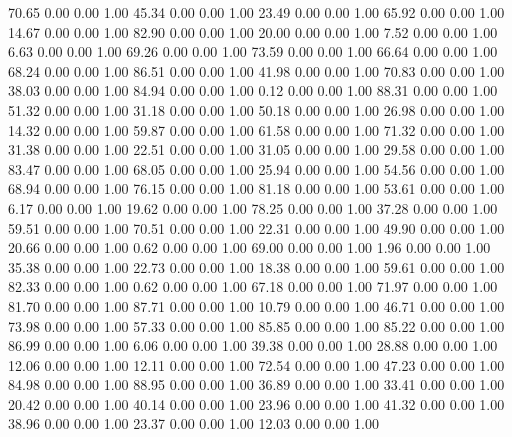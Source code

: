    70.65   0.00   0.00   1.00
   45.34   0.00   0.00   1.00
   23.49   0.00   0.00   1.00
   65.92   0.00   0.00   1.00
   14.67   0.00   0.00   1.00
   82.90   0.00   0.00   1.00
   20.00   0.00   0.00   1.00
    7.52   0.00   0.00   1.00
    6.63   0.00   0.00   1.00
   69.26   0.00   0.00   1.00
   73.59   0.00   0.00   1.00
   66.64   0.00   0.00   1.00
   68.24   0.00   0.00   1.00
   86.51   0.00   0.00   1.00
   41.98   0.00   0.00   1.00
   70.83   0.00   0.00   1.00
   38.03   0.00   0.00   1.00
   84.94   0.00   0.00   1.00
    0.12   0.00   0.00   1.00
   88.31   0.00   0.00   1.00
   51.32   0.00   0.00   1.00
   31.18   0.00   0.00   1.00
   50.18   0.00   0.00   1.00
   26.98   0.00   0.00   1.00
   14.32   0.00   0.00   1.00
   59.87   0.00   0.00   1.00
   61.58   0.00   0.00   1.00
   71.32   0.00   0.00   1.00
   31.38   0.00   0.00   1.00
   22.51   0.00   0.00   1.00
   31.05   0.00   0.00   1.00
   29.58   0.00   0.00   1.00
   83.47   0.00   0.00   1.00
   68.05   0.00   0.00   1.00
   25.94   0.00   0.00   1.00
   54.56   0.00   0.00   1.00
   68.94   0.00   0.00   1.00
   76.15   0.00   0.00   1.00
   81.18   0.00   0.00   1.00
   53.61   0.00   0.00   1.00
    6.17   0.00   0.00   1.00
   19.62   0.00   0.00   1.00
   78.25   0.00   0.00   1.00
   37.28   0.00   0.00   1.00
   59.51   0.00   0.00   1.00
   70.51   0.00   0.00   1.00
   22.31   0.00   0.00   1.00
   49.90   0.00   0.00   1.00
   20.66   0.00   0.00   1.00
    0.62   0.00   0.00   1.00
   69.00   0.00   0.00   1.00
    1.96   0.00   0.00   1.00
   35.38   0.00   0.00   1.00
   22.73   0.00   0.00   1.00
   18.38   0.00   0.00   1.00
   59.61   0.00   0.00   1.00
   82.33   0.00   0.00   1.00
    0.62   0.00   0.00   1.00
   67.18   0.00   0.00   1.00
   71.97   0.00   0.00   1.00
   81.70   0.00   0.00   1.00
   87.71   0.00   0.00   1.00
   10.79   0.00   0.00   1.00
   46.71   0.00   0.00   1.00
   73.98   0.00   0.00   1.00
   57.33   0.00   0.00   1.00
   85.85   0.00   0.00   1.00
   85.22   0.00   0.00   1.00
   86.99   0.00   0.00   1.00
    6.06   0.00   0.00   1.00
   39.38   0.00   0.00   1.00
   28.88   0.00   0.00   1.00
   12.06   0.00   0.00   1.00
   12.11   0.00   0.00   1.00
   72.54   0.00   0.00   1.00
   47.23   0.00   0.00   1.00
   84.98   0.00   0.00   1.00
   88.95   0.00   0.00   1.00
   36.89   0.00   0.00   1.00
   33.41   0.00   0.00   1.00
   20.42   0.00   0.00   1.00
   40.14   0.00   0.00   1.00
   23.96   0.00   0.00   1.00
   41.32   0.00   0.00   1.00
   38.96   0.00   0.00   1.00
   23.37   0.00   0.00   1.00
   12.03   0.00   0.00   1.00
